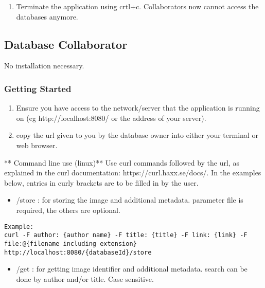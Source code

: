 \begin{enumerate}
\def\labelenumi{\arabic{enumi}.}
\setcounter{enumi}{2}
\tightlist
\item
  Terminate the application using crtl+c. Collaborators now cannot
  access the databases anymore.
\end{enumerate}

\hypertarget{database-collaborator}{%
\subsection{Database Collaborator}\label{database-collaborator}}

No installation necessary.

\hypertarget{getting-started-1}{%
\subsubsection{Getting Started}\label{getting-started-1}}

\begin{enumerate}
\def\labelenumi{\arabic{enumi}.}
\tightlist
\item
  Ensure you have access to the network/server that the application is
  running on (eg http://localhost:8080/ or the address of your server).
\item
  copy the url given to you by the database owner into either your
  terminal or web browser.
\end{enumerate}

** Command line use (linux)** Use curl commands followed by the url, as
explained in the curl documentation: https://curl.haxx.se/docs/. In the
examples below, entries in curly brackets are to be filled in by the
user.

\begin{itemize}
\tightlist
\item
   /store : for storing the image and additional metadata. parameter
  file is required, the others are optional. 
\end{itemize}

\begin{verbatim}
Example:
curl -F author: {author name} -F title: {title} -F link: {link} -F file:@{filename including extension} http://localhost:8080/{databaseId}/store
\end{verbatim}

\begin{itemize}
\tightlist
\item
   /get : for getting image identifier and additional metadata. search
  can be done by author and/or title. Case sensitive. 
\end{itemize}

